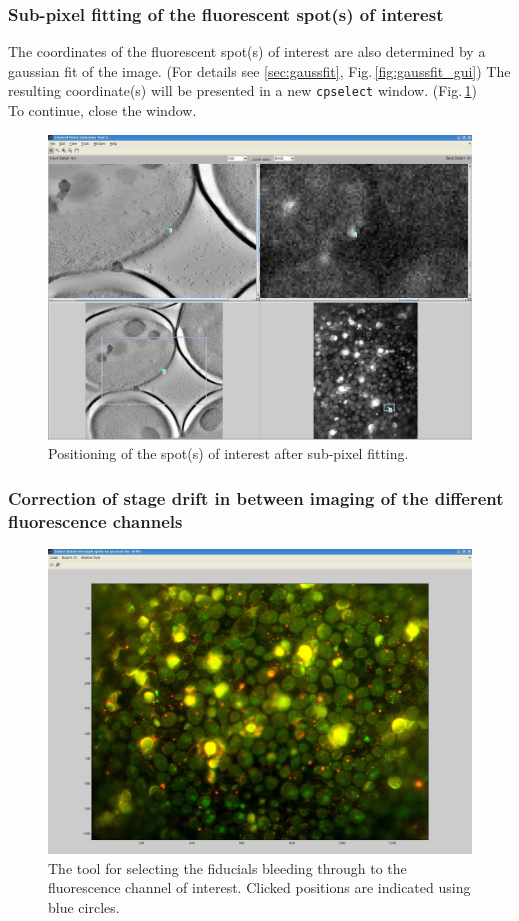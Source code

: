 \documentclass[10pt,a4paper,onepage,DIV12]{scrartcl}
\begin{document}
\subsubsection{Sub-pixel fitting of the fluorescent spot(s) of interest}
The coordinates of the fluorescent spot(s) of interest are also determined by a gaussian fit of the image. (For details see \ref{sec:gaussfit}, Fig.\,\ref{fig:gaussfit_gui}) The resulting coordinate(s) will be presented in a new \texttt{cpselect} window. (Fig.\,\ref{fig:cpsel_fluor2})\\

To continue, close the window. 
\newpage
% 

\begin{figure}
 \centering
 \includegraphics[width=.78\textwidth]{images/cpsel_fluor2.jpg}
 \caption{Positioning of the spot(s) of interest after sub-pixel fitting.}
 \label{fig:cpsel_fluor2}
\end{figure}

\subsubsection{Correction of stage drift in between imaging of the different fluorescence channels}

\begin{figure}
 \centering
 \includegraphics[width=.68\textwidth]{images/digitize.jpg}
 \caption{The tool for selecting the fiducials bleeding through to the fluorescence channel of interest. Clicked positions are indicated using blue circles.}
 \label{fig:digitize}
\end{figure}
\end{document}
